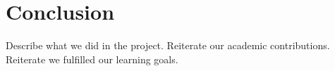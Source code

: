 \chapter{Conclusion}
Describe what we did in the project.
Reiterate our academic contributions.
Reiterate we fulfilled our learning goals.

